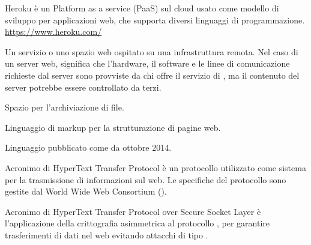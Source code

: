 Heroku è un Platform as a service (PaaS) sul cloud usato come modello di sviluppo per applicazioni web, che supporta diversi linguaggi di programmazione.\\
\url{https://www.heroku.com/}

Un servizio o uno spazio web ospitato su una infrastruttura remota.
Nel caso di un server web, significa che l’hardware, il software e le linee di comunicazione richieste dal server sono provviste da chi offre il servizio di , ma il contenuto del server potrebbe essere controllato da terzi.

Spazio per l’archiviazione di file.

Linguaggio di markup per la strutturazione di pagine web.

Linguaggio  pubblicato come  da ottobre 2014.

Acronimo di HyperText Transfer Protocol \`e un protocollo utilizzato come sistema per la trasmissione di informazioni sul web. Le specifiche del protocollo sono gestite dal World Wide Web Consortium ().

Acronimo di  HyperText Transfer Protocol over Secure Socket Layer \`e l'applicazione della crittografia asimmetrica al protocollo , per garantire trasferimenti di dati nel web evitando attacchi di tipo .
\clearpage